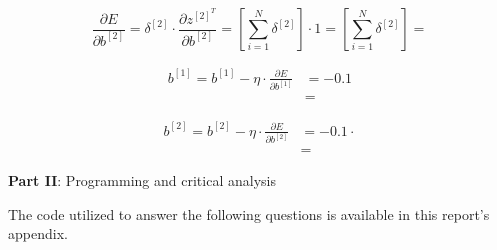 \documentclass[12pt]{article}
\begin{document}
\begin{enumerate}[leftmargin=\labelsep]
        \begin{equation*}
          \frac{\partial E}{\partial b^{[2]}} = \delta^{[2]} \cdot
          \frac{\partial z^{[2]^T}}{\partial b^{[2]}}
          = \left[\sum_{i=1}^N \delta^{[2]}\right] \cdot 1
          = \left[\sum_{i=1}^N \delta^{[2]}\right]
          = 
        \end{equation*}

        \begin{equation*}
          \begin{aligned}
            b^{[1]} = b^{[1]} - \eta \cdot \frac{\partial E}{\partial b^{[1]}}
             & =  - 0.1  \\
             & = 
          \end{aligned}
        \end{equation*}

        \begin{equation*}
          \begin{aligned}
            b^{[2]} = b^{[2]} - \eta \cdot \frac{\partial E}{\partial b^{[2]}}
             & =  - 0.1 \cdot  \\
             & = 
          \end{aligned}
        \end{equation*}

\end{enumerate}

\pagebreak

\center\large{\textbf{Part II}: Programming and critical analysis}

\begin{justify}
  The code utilized to answer the following questions is available in this
  report's appendix.
\end{justify}
\end{document}
